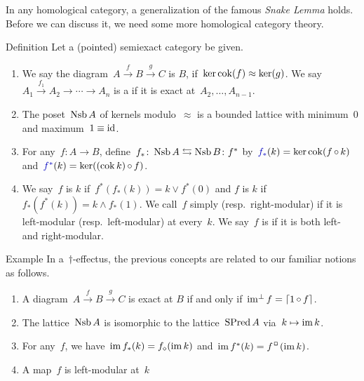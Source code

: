 \documentclass[b]{subfiles}
\begin{document}
\begin{parsec}%
\begin{point}%
In any homological category, a generalization
    of the famous \emph{Snake Lemma} holds.
Before we can discuss it, we need some more homological category theory.
\end{point}
\begin{point}{Definition}%
Let a (pointed) semiexact category be given.
\begin{enumerate}
\item
    We say the diagram~$A \xrightarrow{f} B \xrightarrow{g} C$
        is  $B$,
        if~$\ker \operatorname{cok} (f) \approx \ker (g)$.
We say~$A_1 \xrightarrow{f_1} A_2 \to \cdots
            \to A_{n}$
            is a 
            if it is exact at~$A_2, \ldots, A_{n-1}$.
\item
The poset~$\operatorname{Nsb} A$ of kernels modulo~$\approx$
        is a bounded lattice with minimum~$0$ and maximum~$1\equiv \operatorname{id}$.
        \cite[\S1.5]{grandis}
\item
For any~$f\colon A \to B$,
    define~$f_*\colon \operatorname{Nsb} A \leftrightarrows \operatorname{Nsb} B \colon f^*$
        by~$\Define{f_*} (k) = \ker \cok (f \after k)$
        and~$\Define{f^*}(k) = \ker ((\cok k) \after f)$.
\item
We say~$f$ is  $k$
    if~$f^* (f_* (k)) = k \vee f^*(0)$
        and $f$ is  $k$
        if~$f_*(f^* (k)) = k \wedge f_*(1)$.
We call~$f$ simply  (resp.~right-modular)
    if it is left-modular (resp.~left-modular) at every~$k$.
We say~$f$ is 
    if it is both left- and right-modular.
\end{enumerate}
\end{point}
\begin{point}{Example}%
In a~$\dagger$-effectus, the previous concepts are related
to our familiar notions as follows.
\begin{enumerate}
\item
    A diagram~$A \xrightarrow{f} B \xrightarrow{g} C$
        is exact at $B$
        if and only if~$\operatorname{im^\perp} f = \left\lceil1 \mathop{\circ} f\right\rceil$.
\item
    The lattice~$\operatorname{Nsb} A$ is isomorphic to the lattice~$\operatorname{SPred} A$
        via~$k \mapsto \operatorname{im} k$.
\item
    For any~$f$, we
        have~$\operatorname{im} f_*(k) = f_\diamond (\operatorname{im} k)$
        and~$\IM f^*(k) = f^\BOX (\IM k)$.
\item
    A map~$f$ is left-modular at~$k$

\end{enumerate}
\end{point}
\end{parsec}
\end{document}
